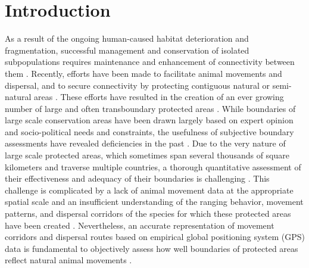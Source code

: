 \documentclass[abstract=on,10pt,a4paper,bibliography=totocnumbered]{article}
\begin{document}
\section{Introduction}
As a result of the ongoing human-caused habitat deterioration and fragmentation,
successful management and conservation of isolated subpopulations requires
maintenance and enhancement of connectivity between them \citep{Hanski.1998,
Fahrig.2003, Lindenmayer.2013}. Recently, efforts have been made to facilitate
animal movements and dispersal, and to secure connectivity by protecting
contiguous natural or semi-natural areas \citep{Heller.2009, Doerr.2011,
Rudnick.2012, Cozzi.2020}. These efforts have resulted in the creation of an
ever growing number of large and often transboundary protected areas
\citep{Wolmer.2003}. While boundaries of large scale conservation areas have
been drawn largely based on expert opinion and socio-political needs and
constraints, the usefulness of subjective boundary assessments have revealed
deficiencies in the past \citep{Pullinger.2010}. Due to the very nature of large
scale protected areas, which sometimes span several thousands of square
kilometers and traverse multiple countries, a thorough quantitative assessment
of their effectiveness and adequacy of their boundaries is challenging
\citep{Rudnick.2012}. This challenge is complicated by a lack of animal movement
data at the appropriate spatial scale and an insufficient understanding of the
ranging behavior, movement patterns, and dispersal corridors of the species for
which these protected areas have been created \citep{Vasudev.2015, Tshipa.2017,
Cozzi.2020}. Nevertheless, an accurate representation of movement corridors and
dispersal routes based on empirical global positioning system (GPS) data is
fundamental to objectively assess how well boundaries of protected areas reflect
natural animal movements \citep{Beier.2008, Doerr.2011, Rudnick.2012}.
\end{document}
